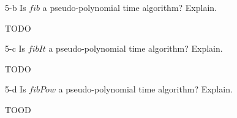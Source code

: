 \documentclass[11pt]{article}
\begin{document}
\begin{prob}{5-b}
Is $fib$ a pseudo-polynomial time algorithm? Explain.
\end{prob}
\begin{sol}
\begin{define}
TODO
\end{define}
\end{sol}

\begin{prob}{5-c}
Is $fibIt$ a pseudo-polynomial time algorithm? Explain.
\end{prob}
\begin{sol}
\begin{define}
TODO
\end{define}
\end{sol}

\begin{prob}{5-d}
Is $fibPow$ a pseudo-polynomial time algorithm? Explain.
\end{prob}
\begin{sol}
\begin{define}
TOOD
\end{define}
\end{sol}
\end{document}
